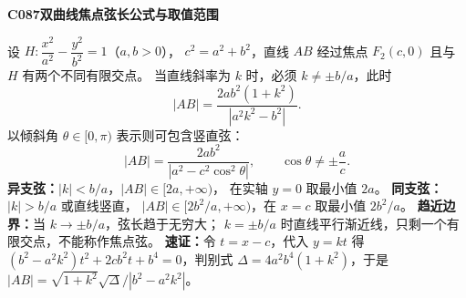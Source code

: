 \textbf{C087\quad 双曲线焦点弦长公式与取值范围}

设 $H:\dfrac{x^2}{a^2}-\dfrac{y^2}{b^2}=1$（$a,b>0$），
$c^2=a^2+b^2$，直线 $AB$ 经过焦点 $F_2(c,0)$ 且与 $H$ 有两个不同有限交点。
当直线斜率为 $k$ 时，必须 $k\ne\pm b/a$，此时
\[
\boxed{|AB|=\frac{2ab^2(1+k^2)}{|a^2k^2-b^2|}}.
\]
以倾斜角 $\theta\in[0,\pi)$ 表示则可包含竖直弦：
\[
\boxed{|AB|=\frac{2ab^2}{|a^2-c^2\cos^2\theta|}},
\qquad \cos\theta\ne\pm\frac ac.
\]
\textbf{异支弦：}$|k|<b/a$，$|AB|\in[2a,+\infty)$，
在实轴 $y=0$ 取最小值 $2a$。
\textbf{同支弦：}$|k|>b/a$ 或直线竖直，
$|AB|\in[2b^2/a,+\infty)$，在 $x=c$ 取最小值 $2b^2/a$。
\textbf{趋近边界：}当 $k\to\pm b/a$，弦长趋于无穷大；
$k=\pm b/a$ 时直线平行渐近线，只剩一个有限交点，不能称作焦点弦。
\textbf{速证：}令 $t=x-c$，代入 $y=kt$ 得
$(b^2-a^2k^2)t^2+2cb^2t+b^4=0$，判别式
$\Delta=4a^2b^4(1+k^2)$，于是 $|AB|=\sqrt{1+k^2}\sqrt\Delta/|b^2-a^2k^2|$。
